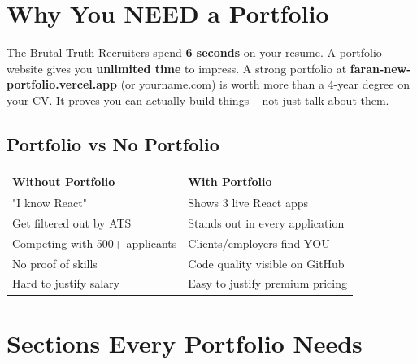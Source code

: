 \documentclass[12pt,a4paper]{article}
\begin{document}
\section{Why You NEED a Portfolio}

\begin{infobox}{The Brutal Truth}
Recruiters spend \textbf{6 seconds} on your resume. A portfolio website gives you \textbf{unlimited time} to impress. A strong portfolio at \textbf{faran-new-portfolio.vercel.app} (or yourname.com) is worth more than a 4-year degree on your CV. It proves you can actually build things -- not just talk about them.
\end{infobox}

\subsection{Portfolio vs No Portfolio}
\begin{center}
\begin{tabularx}{\textwidth}{|X|X|}
\hline
\rowcolor{FaranDark}
\color{white}\textbf{Without Portfolio} & \color{white}\textbf{With Portfolio} \\
\hline
"I know React" & Shows 3 live React apps \\
\hline
\rowcolor{SectionBg}
Get filtered out by ATS & Stands out in every application \\
\hline
Competing with 500+ applicants & Clients/employers find YOU \\
\hline
\rowcolor{SectionBg}
No proof of skills & Code quality visible on GitHub \\
\hline
Hard to justify salary & Easy to justify premium pricing \\
\hline
\end{tabularx}
\end{center}

\newpage

\section{Sections Every Portfolio Needs}
\end{document}
